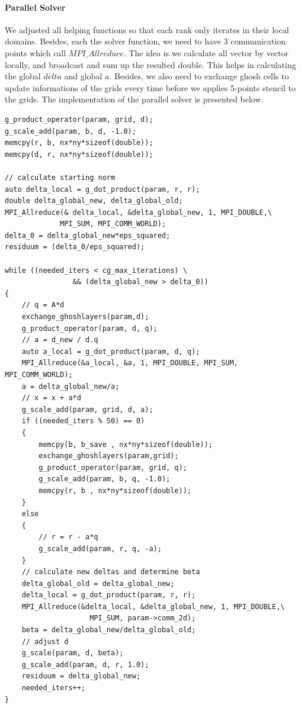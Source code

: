 \documentclass[article]{scrartcl}
\begin{document}
\paragraph{Parallel Solver}
We adjusted all helping functions so that each rank only iterates in their local domains. Besides, each the solver function, we need to have 3 communication points which call $MPI\_Allreduce$. The idea is we calculate all vector by vector locally, and broadcast and sum up the resulted double. This helps in calculating the global $delta$ and global $a$. Besides, we also need to exchange ghosh cells to update informations of the grids every time before we applies 5-points stencil to the grids. The implementation of the parallel solver is presented below.
\begin{frame}[]
\begin{lstlisting}[frame=single]
g_product_operator(param, grid, d);
g_scale_add(param, b, d, -1.0);
memcpy(r, b, nx*ny*sizeof(double));
memcpy(d, r, nx*ny*sizeof(double));

// calculate starting norm
auto delta_local = g_dot_product(param, r, r);
double delta_global_new, delta_global_old;
MPI_Allreduce(& delta_local, &delta_global_new, 1, MPI_DOUBLE,\
			 MPI_SUM, MPI_COMM_WORLD);
delta_0 = delta_global_new*eps_squared;
residuum = (delta_0/eps_squared);

while ((needed_iters < cg_max_iterations) \
				&& (delta_global_new > delta_0))
{
    // q = A*d
    exchange_ghoshlayers(param,d);
    g_product_operator(param, d, q);
    // a = d_new / d.q
    auto a_local = g_dot_product(param, d, q);
    MPI_Allreduce(&a_local, &a, 1, MPI_DOUBLE, MPI_SUM, MPI_COMM_WORLD);
    a = delta_global_new/a;
    // x = x + a*d
    g_scale_add(param, grid, d, a);
    if ((needed_iters % 50) == 0)
    {
        memcpy(b, b_save , nx*ny*sizeof(double));
        exchange_ghoshlayers(param,grid);
        g_product_operator(param, grid, q);
        g_scale_add(param, b, q, -1.0);
        memcpy(r, b , nx*ny*sizeof(double));
    }
    else
    {
        // r = r - a*q
        g_scale_add(param, r, q, -a);
    }
    // calculate new deltas and determine beta
    delta_global_old = delta_global_new;
    delta_local = g_dot_product(param, r, r);
    MPI_Allreduce(&delta_local, &delta_global_new, 1, MPI_DOUBLE,\
    				MPI_SUM, param->comm_2d);
    beta = delta_global_new/delta_global_old;
    // adjust d
    g_scale(param, d, beta);
    g_scale_add(param, d, r, 1.0);
    residuum = delta_global_new;
    needed_iters++;
}
\end{lstlisting}
\end{frame}
\end{document}
